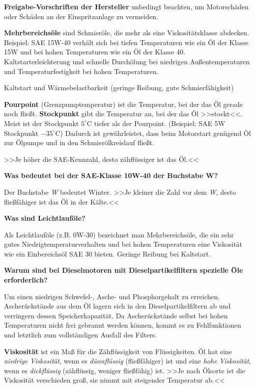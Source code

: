 \textbf{Freigabe-Vorschriften der Hersteller} unbedingt beachten, um
Motorschäden oder Schäden an der Einspritzanlage zu vermeiden.

\textbf{Mehrbereichsöle} sind Schmieröle, die mehr als eine
Viskositätsklasse abdecken. Beispiel: SAE 15W-40 verhält sich bei tiefen
Temperaturen wie ein Öl der Klasse 15W und bei hohen Temperaturen wie
ein Öl der Klasse 40. Kaltstarterleichterung und schnelle Durchölung bei
niedrigen Außentemperaturen und Temperaturfestigkeit bei hohen
Temperaturen.

Kaltstart und Wärmebelastbarkeit (geringe Reibung, gute
Schmierfähigkeit)

\textbf{Pourpoint} (Grenzpumptemperatur) ist die Temperatur, bei der das
Öl gerade noch fließt. \textbf{Stockpunkt} gibt die Temperatur an, bei
der das Öl >>stockt<<. Meist ist der Stockpunkt $5^\circ\text{C}$
tiefer als der Pourpoint. (Beispiel: SAE 5W Stockpunkt
$- 35^\circ\text{C}$) Dadurch ist gewährleistet, dass beim Motorstart
genügend Öl zur Ölpumpe und in den Schmierölkreislauf fließt.

>>Je höher die SAE-Kennzahl, desto zähflüssiger ist das Öl.<<

\textbf{Was bedeutet bei der SAE-Klasse 10W-40 der Buchstabe W?}

Der Buchstabe \emph{W} bedeutet Winter. >>Je kleiner die Zahl vor dem
\emph{W}, desto fließfähiger ist das Öl in der Kälte.<<

\textbf{Was sind Leichtlauföle?}

Als Leichtlauföle (z.B. 0W-30) bezeichnet man Mehrbereichsöle, die ein
sehr gutes Niedrigtemperaturverhalten und bei hohen Temperaturen eine
Viskosität wie ein Einbereichsöl SAE 30 bieten. Geringe Reibung bei
Kaltstart.

\textbf{Warum sind bei Dieselmotoren mit Dieselpartikelfiltern spezielle
Öle erforderlich?}

Um einen niedrigen Schwefel-, Asche- und Phosphorgehalt zu erreichen.
Ascherückstände aus dem Öl lagern sich in den Dieselpartikelfiltern ab
und verringern dessen Speicherkapazität. Da Ascherückstände selbst bei
hohen Temperaturen nicht frei gebrannt werden können, kommt es zu
Fehlfunktionen und letztlich zum vollständigen Ausfall des Filters.

\textbf{Viskosität} ist ein Maß für die Zähflüssigkeit von
Flüssigkeiten. Öl hat eine \emph{niedrige Viskosität}, wenn es
\emph{dünnflüssig} (fließfähiger) ist und eine \emph{hohe Viskosität},
wenn es \emph{dickflüssig} (zähflüssig, weniger fließfähig) ist. >>Je
nach Ölsorte ist die Viskosität verschieden groß, sie nimmt mit
steigender Temperatur ab.<<

